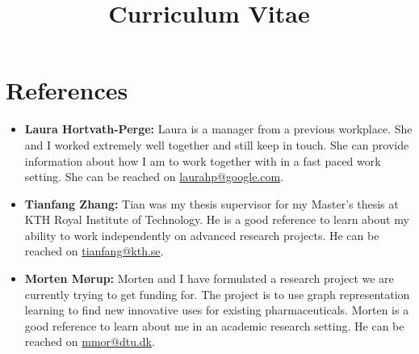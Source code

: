 \documentclass[11pt,a4paper]{moderncv}
\title{Curriculum Vitae}
\begin{document}
\section*{References}

\begin{itemize}
    \item \textbf{Laura Hortvath-Perge:} Laura is a manager from a previous workplace. She and I worked extremely well together and still keep in touch. She can provide information about how I am to work together with in a fast paced work setting. She can be reached on \href{mailto:laurahp@google.com}{laurahp@google.com}.
    \item \textbf{Tianfang Zhang:} Tian was my thesis supervisor for my Master's thesis at KTH Royal Institute of Technology. He is a good reference to learn about my ability to work independently on advanced research projects. He can be reached on \href{mailto:tianfang@kth.se}{tianfang@kth.se}.
    \item \textbf{Morten Mørup:} Morten and I have formulated a research project we are currently trying to get funding for. The project is to use graph representation learning to find new innovative uses for existing pharmaceuticals. Morten is a good reference to learn about me in an academic research setting. He can be reached on \href{mailto:mmor@dtu.dk}{mmor@dtu.dk}.
\end{itemize}
\end{document}
